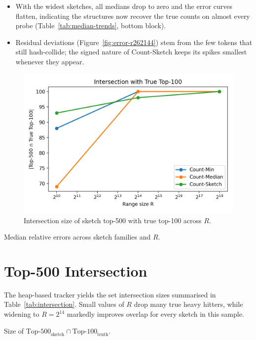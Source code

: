 \documentclass[11pt]{article}
\begin{document}
\begin{itemize}
  \item With the widest sketches, all medians drop to zero and the error curves flatten, indicating the structures now recover the true counts on almost every probe (Table~\ref{tab:median-trends}, bottom block).
  \item Residual deviations (Figure~\ref{fig:error-r262144}) stem from the few tokens that still hash-collide; the signed nature of Count-Sketch keeps its spikes smallest whenever they appear.
\end{itemize}


\begin{figure}[H]
  \centering
  \includegraphics[width=0.55\linewidth]{../outputs/a2/top500_intersection.png}
  \caption{Intersection size of sketch top-500 with true top-100 across $R$.}
 \label{fig:top500}
\end{figure}


\begin{table}[H]
  \centering
  
  \caption{Median relative errors across sketch families and $R$.}
  \label{tab:median-trends}
\end{table}






\section{Top-500 Intersection}
The heap-based tracker yields the set intersection sizes summarised in Table~\ref{tab:intersection}. Small values of $R$ drop many true heavy hitters, while widening to $R=2^{14}$ markedly improves overlap for every sketch in this sample.

\begin{table}[H]
  \centering
  
  \caption{Size of $\text{Top-500}_{\text{sketch}} \cap \text{Top-100}_{\text{truth}}$.}
  \label{tab:intersection}
\end{table}
\end{document}
